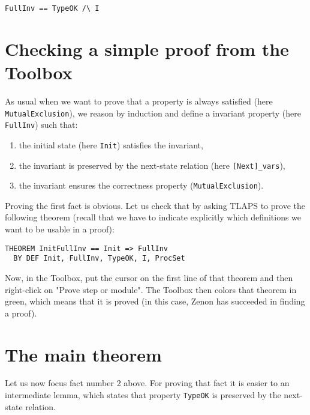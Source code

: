 \documentclass{enonce}
\begin{document}
\begin{verbatim}
FullInv == TypeOK /\ I
\end{verbatim}


\section{Checking a simple proof from the Toolbox}
\label{simple}
As usual when we want to prove that a property is always satisfied (here {\tt MutualExclusion}), we reason by induction and define a invariant property (here {\tt FullInv}) such that:
\begin{enumerate}
\item the initial state (here {\tt Init}) satisfies the invariant,
\item the invariant is preserved by the next-state relation (here {\tt [Next]\_vars}),
\item the invariant ensures the correctness property ({\tt MutualExclusion}).  
\end{enumerate}

\noindent Proving the first fact is obvious. Let us check that by asking TLAPS to prove the following theorem (recall that we have to indicate explicitly which definitions we want to be usable in a proof):

\begin{verbatim}
THEOREM InitFullInv == Init => FullInv
  BY DEF Init, FullInv, TypeOK, I, ProcSet
\end{verbatim}


\noindent Now, in the Toolbox, put the cursor on the first line of that theorem and then right-click on "Prove step or module". The Toolbox then colors that theorem in green, which means that it is proved (in this case, Zenon has succeeded in finding a proof).

\section{The main theorem}

\noindent Let us now focus fact number 2 above. For proving that fact it is easier to an intermediate lemma, which states that property {\tt TypeOK} is preserved by the next-state relation.

%
\end{document}

